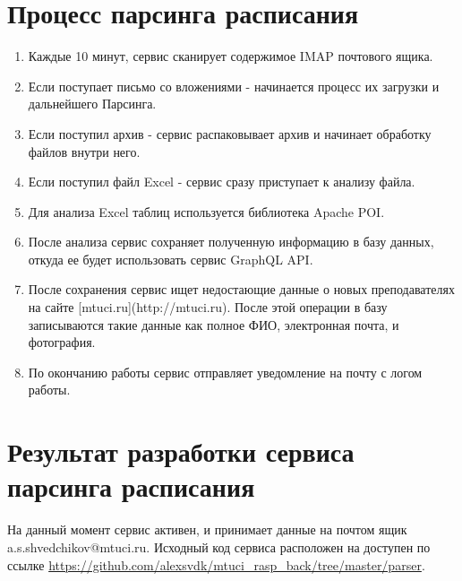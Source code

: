 \section{Процесс парсинга расписания}
\begin{enumerate}
\item Каждые 10 минут, сервис сканирует содержимое IMAP почтового ящика.
\item Если поступает письмо со вложениями - начинается процесс их загрузки и дальнейшего Парсинга.
\item Если поступил архив - сервис распаковывает архив и начинает обработку файлов внутри него.
\item Если поступил файл Excel - сервис сразу приступает к анализу файла.
\item Для анализа Excel таблиц используется библиотека Apache POI.
\item После анализа сервис сохраняет полученную информацию в базу данных, откуда ее будет использовать сервис GraphQL API.
\item После сохранения сервис ищет недостающие данные о новых преподавателях на сайте 
[mtuci.ru](http://mtuci.ru). После этой операции в базу записываются такие данные как полное ФИО, 
электронная почта, и фотография.
\item По окончанию работы сервис отправляет уведомление на почту с логом работы.
\end{enumerate}

\section{Результат разработки сервиса парсинга расписания}
На данный момент сервис активен, и принимает данные на почтом ящик a.s.shvedchikov@mtuci.ru. 
Исходный код сервиса расположен на доступен по ссылке \url{https://github.com/alexsvdk/mtuci_rasp_back/tree/master/parser}.
